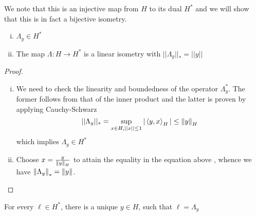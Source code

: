 \documentclass{article}
\begin{document}
We note that this is an injective map from  \(H\) to its dual  \(H^*\) and we will show that this is in fact a bijective isometry.  

\begin{lemma}
    \hfill
    \begin{enumerate}[i)]
        \item  \(\Lambda_y \in H^*\)
        \item The map  \(\Lambda: H \to H^*\) is a linear isometry with  \(||\Lambda_y||_{*}=||y||\)
    \end{enumerate}
\end{lemma}  

\begin{proof}
    \begin{enumerate}[i)]
        \item We need to check the linearity and boundedness of the operator  \(\Lambda_y^*\). The former follows from that of the inner product and the latter is proven by applying Cauchy-Schwarz  
        \begin{equation*}
            ||\Lambda_y||_* = \sup_{x\in H, ||x|| \leq 1} |\left<{y},{x}\right>_H| \leq \left\|{y}\right\|_H
        \end{equation*}  
        which implies  \(\Lambda_y \in H^*\)
        
        \item Choose  \(x = \frac{y}{\left\|{y}\right\|_H}\) to attain the equality in the equation above , whence we have  \(\left\|{\Lambda_y}\right\|_*=\left\|{y}\right\|\).
    \end{enumerate}
\end{proof}

\begin{theorem}
     \nl
    \label{riesz representation}
    For every  \(\ell \in H^*\), there is a unique  \(y \in H\), such that  \(\ell=\Lambda_y\)
\end{theorem}  
\end{document}
